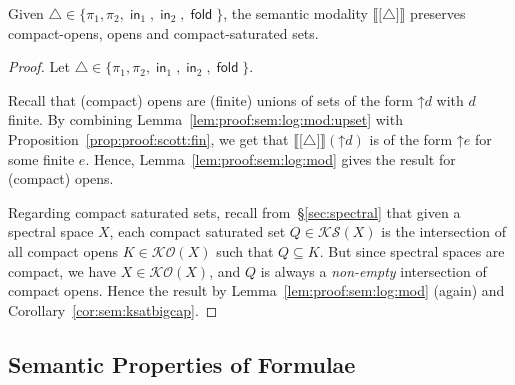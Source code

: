 \documentclass[%
  a4paper,
  UKenglish,
  cleveref,
  autoref,
  thm-restate,
  numberwithinsect,
]{lipics-v2021}
\newcommand\sle\subseteq
\newcommand\up{\mathord{\uparrow}}
\newcommand\I[1]{\llbracket #1 \rrbracket} %
\newcommand\Open{\mathcal{O}}		%
\newcommand\K{\mathcal{K}}		%
\newcommand\Sat{\mathcal{S}}		%
\newcommand\term[1]{\mathsf{#1}}
\newcommand\inj{\mathop{\term{in}}}
\newcommand\fold{\mathop{\term{fold}}}
\newcommand\form[1]{\lbrack #1 \rbrack}
\newcommand\modgen{\mathord{\triangle}}	%
\begin{document}
\begin{lemma}
\label{lem:proof:sem:log:mod:mod}
Given $\modgen \in \{\pi_1, \pi_2, \inj_1, \inj_2, \fold\}$,
the semantic modality $\I{\form\modgen}$
preserves compact-opens, opens and compact-saturated sets.
\end{lemma}

\begin{proof}
Let $\modgen \in \{\pi_1, \pi_2, \inj_1, \inj_2, \fold\}$.

Recall that (compact) opens are (finite) unions of sets of the form
$\up d$ with $d$ finite.
By combining Lemma~\ref{lem:proof:sem:log:mod:upset} with
Proposition~\ref{prop:proof:scott:fin},
we get that $\I{\form\modgen}(\up d)$ is of the form $\up e$
for some finite $e$.
Hence, Lemma~\ref{lem:proof:sem:log:mod} gives the result for (compact) opens.

Regarding compact saturated sets, recall from~\S\ref{sec:spectral}
that given a spectral space $X$,
each compact saturated set $Q \in \K\Sat(X)$
is the intersection of all compact opens $K \in \K\Open(X)$
such that $Q \sle K$.
But since spectral spaces are compact, we have $X \in \K\Open(X)$,
and $Q$ is always a \emph{non-empty} intersection of compact opens.
Hence the result by Lemma~\ref{lem:proof:sem:log:mod} (again)
and Corollary~\ref{cor:sem:ksatbigcap}.
\end{proof}


\subsection{Semantic Properties of Formulae}
\label{sec:proof:sem:log:form}
\end{document}
